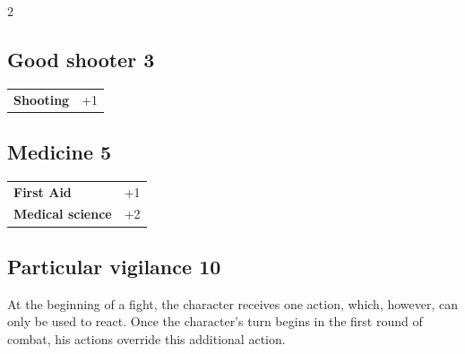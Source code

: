 \begin{multicols}{2}
\begin{tcolorbox}
\end{tcolorbox}

\begin{tcolorbox}
    \subsection*{Good shooter \hfill \small{3 }}
    \tcblower




\begin{tabular}{@{}ll@{}}
    \textbf{Shooting} & +1\\
\end{tabular}


\end{tcolorbox}

\begin{tcolorbox}
    \subsection*{Medicine \hfill \small{5 }}
    \tcblower




\begin{tabular}{@{}ll@{}}
    \textbf{First Aid} & +1\\
    \textbf{Medical science} & +2\\
\end{tabular}


\end{tcolorbox}

\begin{tcolorbox}
    \subsection*{Particular vigilance \hfill \small{10 }}
    \tcblower
At the beginning of a fight, the character receives one action, which, however, can only be used to react. Once the character's turn begins in the first round of combat, his actions override this additional action.


\vspace{3mm}



\end{tcolorbox}
\end{multicols}
